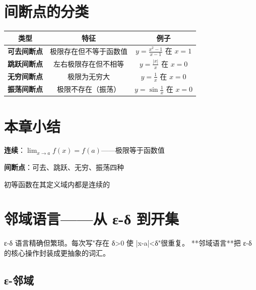 \section{间断点的分类}

\begin{definitionbox}[间断点分类]
\begin{center}
\begin{tabular}{c|c|c}
\textbf{类型} & \textbf{特征} & \textbf{例子} \\
\hline
\textbf{可去间断点} & 极限存在但不等于函数值 & \(y=\frac{x^2-1}{x-1}\) 在 \(x=1\) \\
\textbf{跳跃间断点} & 左右极限存在但不相等 & \(y=\frac{|x|}{x}\) 在 \(x=0\) \\
\textbf{无穷间断点} & 极限为无穷大 & \(y=\frac{1}{x}\) 在 \(x=0\) \\
\textbf{振荡间断点} & 极限不存在（振荡） & \(y=\sin\frac{1}{x}\) 在 \(x=0\) \\
\end{tabular}
\end{center}
\end{definitionbox}


\section{本章小结}

\begin{progressbox}
\textbf{连续}：\(\lim_{x\to a} f(x) = f(a)\)——极限等于函数值

\textbf{间断点}：可去、跳跃、无穷、振荡四种

初等函数在其定义域内都是连续的
\end{progressbox}


\section{邻域语言——从 ε-δ 到开集}

ε-δ 语言精确但繁琐。每次写"存在 δ>0 使 |x-a|<δ"很重复。
**邻域语言**把 ε-δ 的核心操作封装成更抽象的词汇。

\subsection{ε-邻域}

